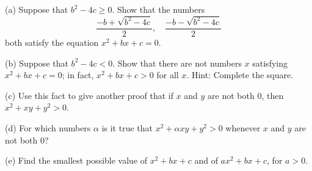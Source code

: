 \begin{tcolorbox}[title=Problem 18, breakable]
    (a) Suppose that $b^2 - 4c \ge 0$. Show that the numbers 
    \[\frac{-b + \sqrt{b^2 - 4c}}{2}, \quad \frac{-b - \sqrt{b^2 - 4c}}{2}\]
    both satisfy the equation $x^2 + bx + c = 0$.

    (b) Suppose that $b^2 - 4c < 0$. Show that there are not numbers $x$ satisfying
    $x^2 + bx + c = 0$; in fact, $x^2 + bx + c > 0$ for all $x$. Hint: Complete
    the square.

    (c) Use this fact to give another proof that if $x$ and $y$ are not both $0$, then
    $x^2 + xy + y^2 > 0$.

    (d) For which numbers $\alpha$ is it true that $x^2 + \alpha x y + y^2 > 0$ whenever 
    $x$ and $y$ are not both $0$?

    (e) Find the smallest possible value of $x^2 + bx + c$ and of $ax^2 + bx + c$,
    for $a > 0$.
\end{tcolorbox}

